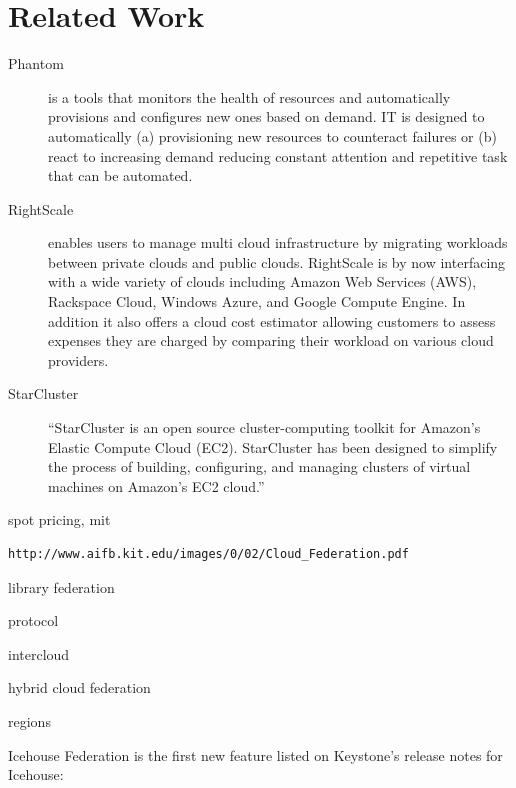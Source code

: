 \documentclass{tex/sig-alternate}
\begin{document}
\section{Related Work}

\begin{description}

\item[Phantom] \cite{phantom12,www-phantom} is a tools that monitors the health of resources and
  automatically provisions and configures new ones based on demand. IT
  is designed to automatically (a) provisioning new
  resources to counteract failures or (b) react to increasing demand
  reducing  constant attention and repetitive task that can be
  automated. 

\item[RightScale] \cite{Rightscale} enables users to manage multi cloud infrastructure
  by migrating workloads between private clouds and public
  clouds. RightScale is by now interfacing with a wide variety of
  clouds including Amazon Web Services (AWS), Rackspace Cloud,
  Windows Azure, and Google Compute Engine. In addition it also offers
  a cloud cost estimator allowing customers to assess expenses 
  they are charged by comparing their workload on various cloud
  providers.

\item[StarCluster] \cite{www-starcluster} ``StarCluster is an open source cluster-computing toolkit for Amazon's Elastic Compute Cloud (EC2). StarCluster has been designed to simplify the process of building, configuring, and managing clusters of virtual machines on Amazon's EC2 cloud.''

\end{description}




spot pricing, mit 

\begin{verbatim}
http://www.aifb.kit.edu/images/0/02/Cloud_Federation.pdf
\end{verbatim}

library federation

protocol

intercloud

hybrid cloud federation

regions


Icehouse
Federation is the first new feature listed on Keystone's release notes for Icehouse:
\end{document}
